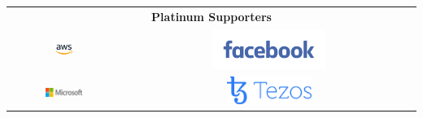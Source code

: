 
\begin{center}
  \begin{tabular}{c@{~~~~~~}c}
   \multicolumn{2}{c}{{\huge\bf Platinum Supporters}}\\[3ex]    
    \includegraphics[width=0.2\textwidth]{img/logos/amazon-logo.png}  &
    \includegraphics[width=0.4\textwidth]{img/logos/Facebook-06-2015-Blue.png} \\
    \includegraphics[width=0.35\textwidth]{img/logos/microsoft.jpg} &
    \includegraphics[width=0.3\textwidth]{img/logos/tezos.png} \\
  \end{tabular}
\end{center}

  \vspace*{.75in}

